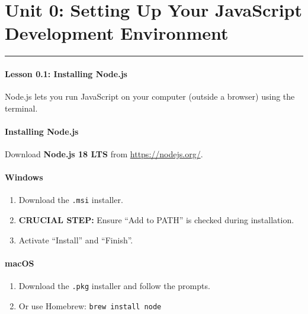 \documentclass[
  justified,
  openright,
]{tufte-book}
\let\subsection\paragraph
\let\paragraph\paragraph
\let\subsection\paragraph
\let\paragraph\paragraph
\providecommand{\tightlist}{%
  \setlength{\itemsep}{0pt}\setlength{\parskip}{0pt}}
\begin{document}
\newpage

\section{Unit 0: Setting Up Your JavaScript Development
Environment}\label{unit-0-setting-up-your-javascript-development-environment}

\begin{center}\rule{0.5\linewidth}{0.5pt}\end{center}

\subsection{Lesson 0.1: Installing
Node.js}\label{lesson-0.1-installing-node.js-1}

Node.js lets you run JavaScript on your computer (outside a browser)
using the terminal.

\subsection{Installing Node.js}\label{installing-node.js}

Download \textbf{Node.js 18 LTS} from \url{https://nodejs.org/}.

\paragraph{Windows}\label{windows-2}

\begin{enumerate}
\def\labelenumi{\arabic{enumi}.}
\tightlist
\item
  Download the \texttt{.msi} installer.
\item
  \textbf{CRUCIAL STEP:} Ensure ``Add to PATH'' is checked during
  installation.
\item
  Activate ``Install'' and ``Finish''.
\end{enumerate}

\paragraph{macOS}\label{macos-2}

\begin{enumerate}
\def\labelenumi{\arabic{enumi}.}
\tightlist
\item
  Download the \texttt{.pkg} installer and follow the prompts.
\item
  Or use Homebrew: \texttt{brew\ install\ node}
\end{enumerate}
\end{document}
